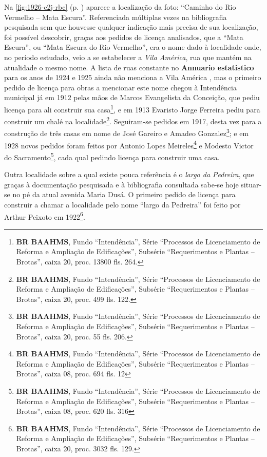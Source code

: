 



Na \autoref{fig:1926-e2j-rbc} (p. \pageref{fig:1926-e2j-rbc}) aparece a localização da foto: ``Caminho do Rio Vermelho -- Mata Escura''. Referenciada múltiplas vezes na bibliografia pesquisada sem que houvesse qualquer indicação mais precisa de sua localização, foi possível descobrir, graças aos pedidos de licença analisados, que a ``Mata Escura'', ou ``Mata Escura do Rio Vermelho'', era o nome dado à localidade onde, no período estudado, veio a se estabelecer a \textit{Vila América}, rua que mantém na atualidade o mesmo nome. A lista de ruas constante no \textbf{Annuario estatistico} para os anos de 1924 e 1925 ainda não menciona a Vila América \cite{bahia_annuario_1926}, mas o primeiro pedido de licença para obras a mencionar este nome chegou à Intendência municipal já em 1912 pelas mãos de Marcos Evangelista da Conceição, que pediu licença para ali construir sua casa\footnote{\textbf{BR BAAHMS}, Fundo ``Intendência'', Série ``Processos de Licenciamento de Reforma e Ampliação de Edificações'', Subsérie ``Requerimentos e Plantas -- Brotas'', caixa 20, proc. 13800 fls. 264.}, e em 1913 Evaristo Jorge Ferreira pediu para construir um chalé na localidade\footnote{\textbf{BR BAAHMS}, Fundo ``Intendência'', Série ``Processos de Licenciamento de Reforma e Ampliação de Edificações'', Subsérie ``Requerimentos e Plantas -- Brotas'', caixa 20, proc. 499 fls. 122.}. Seguiram-se pedidos em 1917, desta vez para a construção de três casas em nome de José Gareiro e Amadeo Gonzalez\footnote{\textbf{BR BAAHMS}, Fundo ``Intendência'', Série ``Processos de Licenciamento de Reforma e Ampliação de Edificações'', Subsérie ``Requerimentos e Plantas -- Brotas'', caixa 20, proc. 55 fls. 206.}; e em 1928 novos pedidos foram feitos por Antonio Lopes Meireles\footnote{\textbf{BR BAAHMS}, Fundo ``Intendência'', Série ``Processos de Licenciamento de Reforma e Ampliação de Edificações'', Subsérie ``Requerimentos e Plantas -- Brotas'', caixa 08, proc. 694 fls. 12} e Modesto Victor do Sacramento\footnote{\textbf{BR BAAHMS}, Fundo ``Intendência'', Série ``Processos de Licenciamento de Reforma e Ampliação de Edificações'', Subsérie ``Requerimentos e Plantas -- Brotas'', caixa 08, proc. 620 fls. 316}, cada qual pedindo licença para construir uma casa. 

Outra localidade sobre a qual existe pouca referência é o \textit{largo da Pedreira}, que graças à documentação pesquisada e à bibliografia consultada sabe-se hoje situar-se no pé da atual avenida Maria Dusá. O primeiro pedido de licença para construir a chamar a localidade pelo nome ``largo da Pedreira'' foi feito por Arthur Peixoto em 1922\footnote{\textbf{BR BAAHMS}, Fundo ``Intendência'', Série ``Processos de Licenciamento de Reforma e Ampliação de Edificações'', Subsérie ``Requerimentos e Plantas -- Brotas'', caixa 20, proc. 3032 fls. 129.}.

